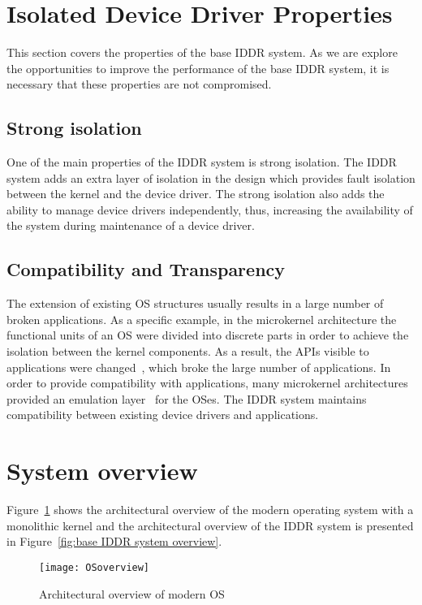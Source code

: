 \section{Isolated Device Driver Properties}
\label{sec:properties}
This section covers the properties of the base IDDR system. As we are explore the opportunities to improve the performance of the base IDDR system, it is necessary that these properties are not compromised.

\subsection*{Strong isolation}
One of the main properties of the IDDR system is strong isolation. The IDDR system adds an extra layer of isolation in the design which provides fault isolation between the kernel and the device driver. The strong isolation also adds the ability to manage device drivers independently, thus, increasing the availability of the system during maintenance of a device driver.

\subsection*{Compatibility and Transparency} 
The extension of existing OS structures usually results in a large number of broken applications. As a specific example, in the microkernel architecture the functional units of an OS were divided into discrete parts in order to achieve the isolation between the kernel components. As a result, the APIs visible to applications were changed~\cite{Heiser06arevirtualmachine}, which broke the large number of applications. In order to provide compatibility with applications, many microkernel architectures provided an emulation layer~\cite{Heiser06arevirtualmachine} for the OSes. The IDDR system maintains compatibility between existing device drivers and applications.

\section{System overview}\label{overview}

Figure~\ref{fig:monolithic} shows the architectural overview of the modern operating system with a monolithic kernel and the architectural overview of the IDDR system is presented in Figure~\ref{fig:base IDDR system overview}.
\\[3mm]
\begin{figure}[!ht]
\centering
\texttt{[image: OSoverview]}
\caption{Architectural overview of modern OS}
\label{fig:monolithic}
\end{figure}

